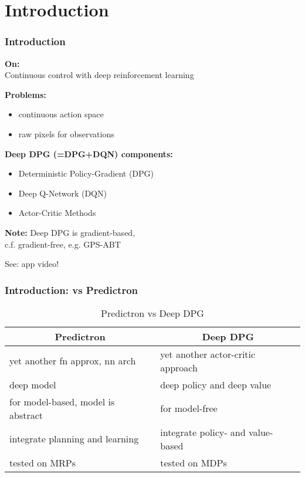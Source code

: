 \section{Introduction}

\begin{frame}
\frametitle{Introduction}
\textbf{On:}\\
Continuous control with deep reinforcement learning~\cite{Lillicrap2015}
\vspace{2mm}

\textbf{Problems:}
\begin{itemize}
  \item continuous action space
  \item raw pixels for observations
\end{itemize}
\vspace{2mm}

\textbf{Deep DPG (=DPG+DQN) components:}
\begin{itemize}
  \item Deterministic Policy-Gradient (DPG) \cite{Silver2014}
  \item Deep Q-Network (DQN) \cite{Mnih2013}
  \item Actor-Critic Methods \cite{Sutton1998}
\end{itemize}
\vspace{2mm}

\textbf{Note:}
Deep DPG is gradient-based, \\
c.f. gradient-free, e.g. GPS-ABT~\cite{Seiler2015}
\vspace{2mm}

See: app video!
\end{frame}

\begin{frame}
\frametitle{Introduction: vs Predictron \cite{Silver2016}}

\begin{table}[]
\centering
\caption{Predictron vs Deep DPG}
\label{my-label}
\begin{tabular}{|l|l|}
\hline
\multicolumn{1}{|c|}{\textbf{Predictron}} & \multicolumn{1}{c|}{\textbf{Deep DPG}} \\ \hline
yet another fn approx, nn arch          & yet another actor-critic approach \\ \hline
deep model          & deep policy and deep value                \\ \hline
for model-based, model is abstract & for model-free                \\ \hline
integrate planning and learning & integrate policy- and value-based \\ \hline
tested on MRPs                  & tested on MDPs                \\ \hline
\end{tabular}
\end{table}
\end{frame}

